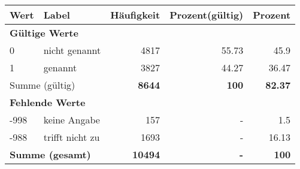      \begin{longtable}{lXrrr}
     \toprule
     \textbf{Wert} & \textbf{Label} & \textbf{Häufigkeit} & \textbf{Prozent(gültig)} & \textbf{Prozent} \\
     \endhead
     \midrule
     \multicolumn{5}{l}{\textbf{Gültige Werte}}\\

     0 &
     \multicolumn{1}{X}{ nicht genannt   } &


       \num{4817} &
       \num[round-mode=places,round-precision=2]{55,73} &
         \num[round-mode=places,round-precision=2]{45,9} \\

     1 &
     \multicolumn{1}{X}{ genannt   } &


       \num{3827} &
       \num[round-mode=places,round-precision=2]{44,27} &
         \num[round-mode=places,round-precision=2]{36,47} \\
     \midrule
     \multicolumn{2}{l}{Summe (gültig)} &
       \textbf{\num{8644}} &
     \textbf{100} &
       \textbf{\num[round-mode=places,round-precision=2]{82,37}} \\
     \multicolumn{5}{l}{\textbf{Fehlende Werte}}\\
       -998 &
       keine Angabe &
         \num{157} &
        - &
         \num[round-mode=places,round-precision=2]{1,5} \\
       -988 &
       trifft nicht zu &
         \num{1693} &
        - &
         \num[round-mode=places,round-precision=2]{16,13} \\
     \midrule
     \multicolumn{2}{l}{\textbf{Summe (gesamt)}} &
          \textbf{\num{10494}} &
        \textbf{-} &
        \textbf{100} \\
     \bottomrule
     \end{longtable}
     
